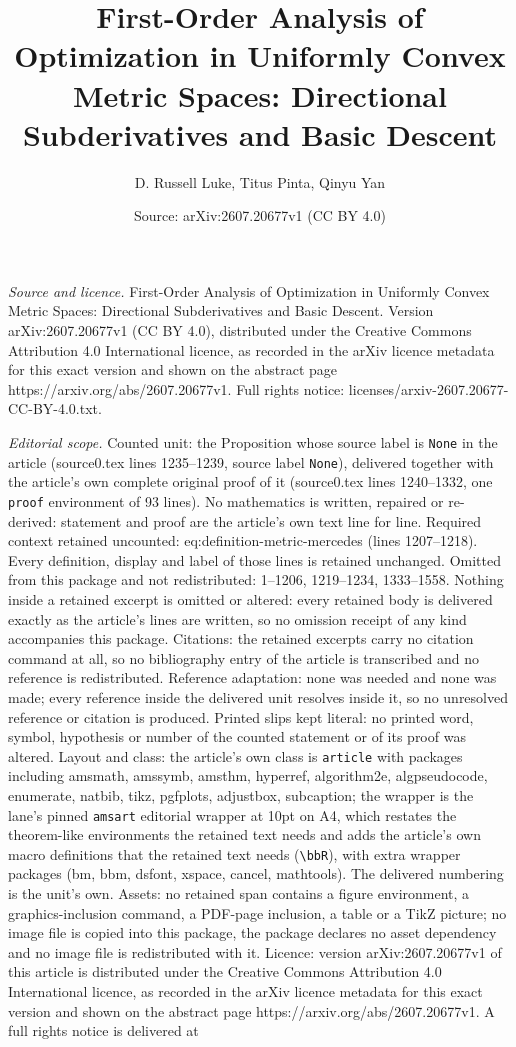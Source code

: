 \documentclass[10pt,a4paper]{amsart}
\title[First-Order Analysis of Optimization in Uniformly Convex Met]{First-Order Analysis of Optimization in Uniformly Convex Metric Spaces: Directional Subderivatives and Basic Descent}
\author{D. Russell Luke, Titus Pinta, Qinyu Yan}
\date{Source: arXiv:2607.20677v1 (CC BY 4.0)}
\begin{document}
\maketitle

\noindent\emph{Source and licence.} First-Order Analysis of Optimization in Uniformly Convex Metric Spaces: Directional Subderivatives and Basic Descent. Version arXiv:2607.20677v1 (CC BY 4.0), distributed under the Creative Commons Attribution 4.0 International licence, as recorded in the arXiv licence metadata for this exact version and shown on the abstract page https://arxiv.org/abs/2607.20677v1. Full rights notice: licenses/arxiv-2607.20677-CC-BY-4.0.txt.\par\smallskip

\noindent\textit{Editorial scope.} Counted unit: the Proposition whose source label is \texttt{None} in the article (source0.tex lines 1235--1239, source label \texttt{None}), delivered together with the article's own complete original proof of it (source0.tex lines 1240--1332, one \texttt{proof} environment of 93 lines). No mathematics is written, repaired or re-derived: statement and proof are the article's own text line for line. Required context retained uncounted: eq:definition-metric-mercedes (lines 1207--1218). Every definition, display and label of those lines is retained unchanged. Omitted from this package and not redistributed: 1--1206, 1219--1234, 1333--1558. Nothing inside a retained excerpt is omitted or altered: every retained body is delivered exactly as the article's lines are written, so no omission receipt of any kind accompanies this package. Citations: the retained excerpts carry no citation command at all, so no bibliography entry of the article is transcribed and no reference is redistributed. Reference adaptation: none was needed and none was made; every reference inside the delivered unit resolves inside it, so no unresolved reference or citation is produced. Printed slips kept literal: no printed word, symbol, hypothesis or number of the counted statement or of its proof was altered. Layout and class: the article's own class is \texttt{article} with packages including amsmath, amssymb, amsthm, hyperref, algorithm2e, algpseudocode, enumerate, natbib, tikz, pgfplots, adjustbox, subcaption; the wrapper is the lane's pinned \texttt{amsart} editorial wrapper at 10pt on A4, which restates the theorem-like environments the retained text needs and adds the article's own macro definitions that the retained text needs (\texttt{\textbackslash bbR}), with extra wrapper packages (bm, bbm, dsfont, xspace, cancel, mathtools). The delivered numbering is the unit's own. Assets: no retained span contains a figure environment, a graphics-inclusion command, a PDF-page inclusion, a table or a TikZ picture; no image file is copied into this package, the package declares no asset dependency and no image file is redistributed with it. Licence: version arXiv:2607.20677v1 of this article is distributed under the Creative Commons Attribution 4.0 International licence, as recorded in the arXiv licence metadata for this exact version and shown on the abstract page https://arxiv.org/abs/2607.20677v1. A full rights notice is delivered at 
\end{document}
